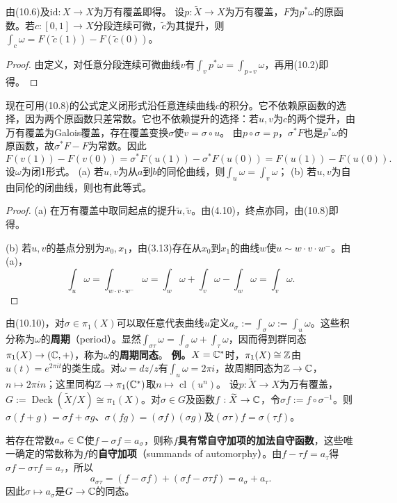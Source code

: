 由(10.6)及$\mathrm{id}:X\to X$为万有覆盖即得。
设$p:\widetilde X\to X$为万有覆盖，$F$为$p^*\omega$的原函数。若$c:[0,1]\to X$分段连续可微，$\widetilde c$为其提升，则$\int_c\omega=F(\widetilde c(1))-F(\widetilde c(0))$。
\begin{proof}
由定义，对任意分段连续可微曲线$v$有$\int_vp^*\omega=\int_{p\circ v}\omega$，再用(10.2)即得。
\end{proof}
现在可用(10.8)的公式定义闭形式沿任意连续曲线$c$的积分。它不依赖原函数的选择，因为两个原函数只差常数。它也不依赖提升的选择：若$u,v$为$c$的两个提升，由万有覆盖为Galois覆盖，存在覆盖变换$\sigma$使$v=\sigma\circ u$。
由$p\circ\sigma=p$，$\sigma^*F$也是$p^*\omega$的原函数，故$\sigma^*F-F$为常数。因此
\[
F(v(1))-F(v(0))=\sigma^*F(u(1))-\sigma^*F(u(0))=F(u(1))-F(u(0)).
\]
设$\omega$为闭1形式。
(a) 若$u,v$为从$a$到$b$的同伦曲线，则$\int_u\omega=\int_v\omega$；
(b) 若$u,v$为自由同伦的闭曲线，则也有此等式。
\begin{proof}
(a) 在万有覆盖中取同起点的提升$\widetilde u,\widetilde v$。由(4.10)，终点亦同，由(10.8)即得。

(b) 若$u,v$的基点分别为$x_0,x_1$，由(3.13)存在从$x_0$到$x_1$的曲线$w$使$u\sim w\cdot v\cdot w^-$。由(a)，
\[
\int_u\omega=\int_{w\cdot v\cdot w^-}\omega=\int_w\omega+\int_v\omega-\int_w\omega=\int_v\omega.
\]
\end{proof}
由(10.10)，对$\sigma\in\pi_1(X)$可以取任意代表曲线$u$定义$a_\sigma:=\int_\sigma\omega:=\int_u\omega$。这些积分称为$\omega$的\textbf{周期}（period）。显然$\int_{\sigma\tau}\omega=\int_\sigma\omega+\int_\tau\omega$，因而得到群同态$\pi_1(X)\to(\mathbb C,+)$，称为$\omega$的\textbf{周期同态}。
\textbf{例。}$X=\mathbb C^*$时，$\pi_1(X)\cong\mathbb Z$由$u(t)=e^{2\pi it}$的类生成。对$\omega=dz/z$有$\int_u\omega=2\pi i$，故周期同态为$\mathbb Z\to\mathbb C$，$n\mapsto2\pi in$；这里同构$\mathbb Z\to\pi_1(\mathbb C^*)$取$n\mapsto\operatorname{cl}(u^n)$。
设$p:\widetilde X\to X$为万有覆盖，$G:=\operatorname{Deck}(\widetilde X/X)\cong\pi_1(X)$。对$\sigma\in G$及函数$f:\widetilde X\to\mathbb C$，令$\sigma f:=f\circ\sigma^{-1}$。则$\sigma(f+g)=\sigma f+\sigma g$、$\sigma(fg)=(\sigma f)(\sigma g)$及$(\sigma\tau)f=\sigma(\tau f)$。

若存在常数$a_\sigma\in\mathbb C$使$f-\sigma f=a_\sigma$，则称$f$\textbf{具有常自守加项的加法自守函数}，这些唯一确定的常数称为$f$的\textbf{自守加项}（summands of automorphy）。由$f-\tau f=a_\tau$得$\sigma f-\sigma\tau f=a_\tau$，所以
\[
a_{\sigma\tau}=(f-\sigma f)+(\sigma f-\sigma\tau f)=a_\sigma+a_\tau.
\]
因此$\sigma\mapsto a_\sigma$是$G\to\mathbb C$的同态。

